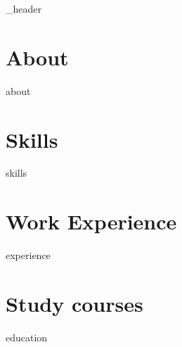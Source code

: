 \documentclass[line, letter,10pt]{article}
\author{Ilya Kazakov}
\begin{document}
{_header}
\vspace*{1pt}

\hline

\section{About}
\vspace*{3pt}
{about}
\vspace*{10pt}


\section{Skills}
\vspace*{3pt}
{skills}
\vspace*{10pt}

\section{Work Experience}
\vspace*{3pt}
{experience}
\vspace*{10pt}

\section{Study courses}
{education}
\vspace*{10pt}
\end{document}
